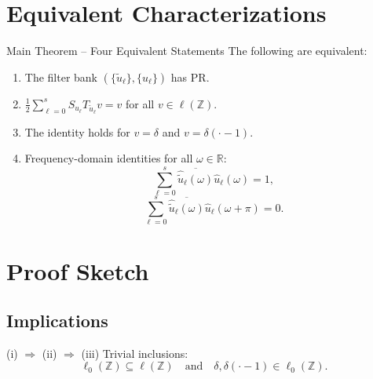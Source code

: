 \documentclass[11pt]{beamer}
\begin{document}
\section{Equivalent Characterizations}

\begin{frame}{Main Theorem -- Four Equivalent Statements}
  The following are equivalent:

  \begin{enumerate}
    \item The filter bank $(\{\tilde u_\ell\},\{u_\ell\})$ has PR.
    \item $\displaystyle\frac12\sum_{\ell=0}^{s} S_{u_\ell}T_{\tilde u_\ell}v = v$ for all $v\in\ell(\mathbb{Z})$.
    \item The identity holds for $v=\delta$ and $v=\delta(\cdot-1)$.
    \item Frequency-domain identities for all $\omega\in\mathbb{R}$:
          \[
            \sum_{\ell=0}^{s}\overline{\hat{\tilde u}_\ell(\omega)}\hat u_\ell(\omega)=1,
          \]
          \[
            \sum_{\ell=0}^{s}\overline{\hat{\tilde u}_\ell(\omega)}\hat u_\ell(\omega+\pi)=0.
          \]
  \end{enumerate}
\end{frame}

\section{Proof Sketch}

\subsection*{Implications}

\begin{frame}{(i) $\Rightarrow$ (ii) $\Rightarrow$ (iii)}
  Trivial inclusions:
  \[
    \ell_0(\mathbb{Z})\subseteq \ell(\mathbb{Z})\quad\text{and}\quad \delta,\delta(\cdot-1)\in\ell_0(\mathbb{Z}).
  \]
\end{frame}
\end{document}
